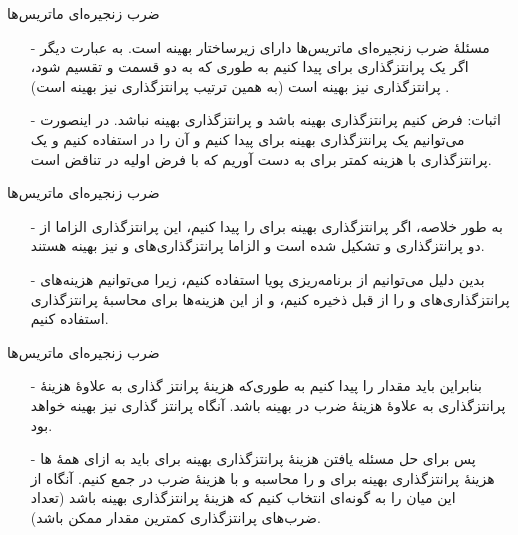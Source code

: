 \begin{frame}{‌ضرب زنجیره‌ای ماتریس‌ها}
\begin{itemize}\itemr
\item[-]
مسئلهٔ ضرب زنجیره‌ای ماتریس‌ها دارای زیرساختار بهینه است. به عبارت دیگر اگر یک پرانتزگذاری برای 
پیدا کنیم به طوری که به دو قسمت 
و
تقسیم شود، پرانتزگذاری
نیز بهینه است (به همین ترتیب پرانتزگذاری 
نیز بهینه است)
.
\item[-]
اثبات: فرض کنیم پرانتزگذاری 
 بهینه باشد و پرانتزگذاری
بهینه نباشد. در اینصورت می‌توانیم یک پرانتزگذاری بهینه برای 
پیدا کنیم و آن را در 
استفاده کنیم و یک پرانتزگذاری با هزینه کمتر برای 
به دست آوریم که با فرض اولیه در تناقض است. 
\end{itemize}
\end{frame}


\begin{frame}{‌ضرب زنجیره‌ای ماتریس‌ها}
\begin{itemize}\itemr
\item[-]
به طور خلاصه، اگر پرانتزگذاری بهینه برای
را پیدا کنیم، این پرانتزگذاری الزاما از دو پرانتزگذاری
و
تشکیل شده است و الزاما پرانتزگذاری‌های
و
نیز بهینه هستند.
\item[-]
بدین دلیل می‌توانیم از برنامه‌ریزی پویا استفاده کنیم، زیرا می‌توانیم هزینه‌های پرانتزگذاری‌های
و
را از قبل ذخیره کنیم، و از این هزینه‌ها برای محاسبهٔ پرانتزگذاری
استفاده کنیم.
\end{itemize}
\end{frame}


\begin{frame}{‌ضرب زنجیره‌ای ماتریس‌ها}
\begin{itemize}\itemr
\item[-]
بنابراین باید مقدار 
 را پیدا کنیم به طوری‌که هزینهٔ پرانتز گذاری
به علاوهٔ هزینهٔ‌ پرانتزگذاری
به علاوهٔ هزینهٔ ضرب
در
بهینه باشد. آنگاه پرانتز گذاری
نیز بهینه خواهد بود.
\item[-]
پس برای حل مسئله یافتن هزینهٔ پرانتزگذاری بهینه برای
باید به ازای همهٔ 
 ها
هزینهٔ‌ پرانتزگذاری بهینه برای 
و 
را محاسبه و با هزینهٔ ضرب
در
جمع کنیم.
آنگاه از این میان 
 را به گونه‌ای انتخاب کنیم که هزینهٔ پرانتزگذاری 
بهینه باشد (تعداد ضرب‌های پرانتزگذاری
 کمترین مقدار ممکن باشد).
\iffalse
\item[-]
عبارت قبل را می‌توانیم به صورت زیر با استفاده از برهان خلف ثابت کنیم. فرض کنیم پرانتز گذاری
\m{A_{i : j}}
بهینه نباشد. این بدین معناست که یک پرانتز گذاری با هزینه کمتر وجود دارد. اما اگر یک پرانتز گذاری بهینه‌تر وجود داشته باشد می‌توان عبارت
\m{A_{i : j}}
را به دو قسمت تقسیم کرد و یک پرانتز گذاری بهتر برای
\m{A_{i : k}}
و
\m{A_{k+1 : j}}
پیدا کرد که در اینصورت به تناقض می‌رسیم.
\fi
\end{itemize}
\end{frame}




